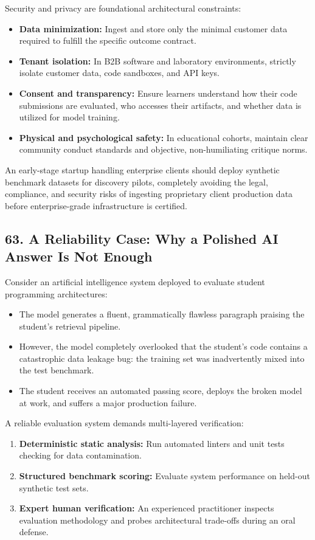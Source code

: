 Security and privacy are foundational architectural constraints:
\begin{itemize}
    \item \textbf{Data minimization:} Ingest and store only the minimal customer data required to fulfill the specific outcome contract.
    \item \textbf{Tenant isolation:} In B2B software and laboratory environments, strictly isolate customer data, code sandboxes, and API keys.
    \item \textbf{Consent and transparency:} Ensure learners understand how their code submissions are evaluated, who accesses their artifacts, and whether data is utilized for model training.
    \item \textbf{Physical and psychological safety:} In educational cohorts, maintain clear community conduct standards and objective, non-humiliating critique norms.
\end{itemize}

An early-stage startup handling enterprise clients should deploy synthetic benchmark datasets for discovery pilots, completely avoiding the legal, compliance, and security risks of ingesting proprietary client production data before enterprise-grade infrastructure is certified.

\subsection*{63. A Reliability Case: Why a Polished AI Answer Is Not Enough}

Consider an artificial intelligence system deployed to evaluate student programming architectures:
\begin{itemize}
    \item The model generates a fluent, grammatically flawless paragraph praising the student's retrieval pipeline.
    \item However, the model completely overlooked that the student's code contains a catastrophic data leakage bug: the training set was inadvertently mixed into the test benchmark.
    \item The student receives an automated passing score, deploys the broken model at work, and suffers a major production failure.
\end{itemize}

A reliable evaluation system demands multi-layered verification:
\begin{enumerate}
    \item \textbf{Deterministic static analysis:} Run automated linters and unit tests checking for data contamination.
    \item \textbf{Structured benchmark scoring:} Evaluate system performance on held-out synthetic test sets.
    \item \textbf{Expert human verification:} An experienced practitioner inspects evaluation methodology and probes architectural trade-offs during an oral defense.
\end{enumerate}

